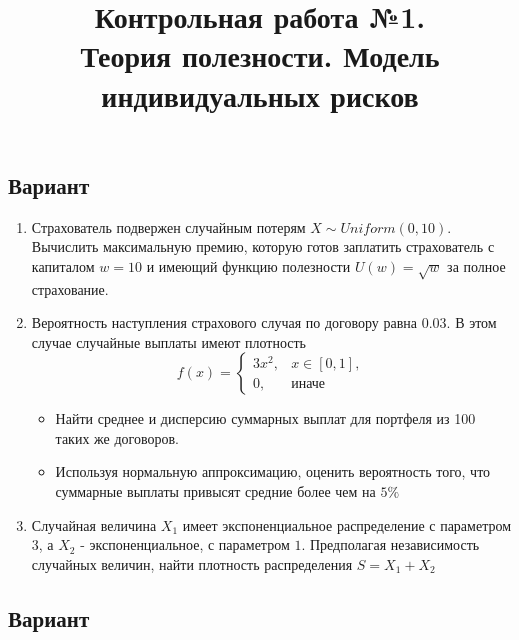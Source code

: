 \documentclass[12pt, letterpaper]{article}
\title{
	Контрольная работа №1. \\
	Теория полезности. Модель индивидуальных рисков
	}
\date{}
\begin{document}
\maketitle

\newpage

\begin{center}
	\section{Вариант}
\end{center}

\begin{enumerate}
	\item 

	Страхователь подвержен случайным потерям $X \sim Uniform(0, 10)$.
	Вычислить максимальную премию, которую готов заплатить страхователь с капиталом $w=10$ и имеющий функцию полезности $U(w) = \sqrt{w}$ за полное страхование.


\item
	Вероятность наступления страхового случая по договору равна $0.03$. В этом случае случайные выплаты имеют плотность
	\[
		f(x) = 
		\begin{cases}
			3x^2, & x \in [0, 1],\\
			0, & \text{иначе}
		\end{cases}
	\]
	\begin{itemize}
		\item Найти среднее и дисперсию суммарных выплат для портфеля из 100 таких же договоров.
		\item Используя нормальную аппроксимацию, оценить вероятность того, что суммарные выплаты привысят средние более чем на $5\%$
	\end{itemize}
	
\item
	Случайная величина $X_1$ имеет экспоненциальное распределение с параметром 3, а $X_2$ - экспоненциальное, с параметром $1$.
	Предполагая независимость случайных величин, найти плотность распределения $S = X_1 + X_2$

\end{enumerate}

\newpage
\begin{center}
	\section{Вариант}
\end{center}
\end{document}
